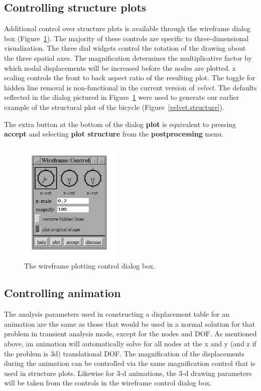 \subsection{Controlling structure plots}

Additional control over structure plots is available through the wireframe
dialog box (Figure~\ref{velvet.wireframe}).  The majority of these controls 
are specific to three-dimensional visualization.  The three dial widgets 
control the rotation of the drawing about the three spatial axes.  The 
magnification determines the multiplicative factor by which nodal 
displacements will be increased before the nodes are plotted.  z scaling 
controls the front to back aspect ratio of the resulting plot.  The toggle
for hidden line removal is non-functional in the current version of
{\em velvet}.  The defaults reflected in the dialog pictured in 
Figure~\ref{velvet.wireframe} were used to generate our earlier example 
of the structural plot of the bicycle (Figure~\ref{velvet.structure}). 

The extra button at the bottom of the dialog {\bf plot} is equivalent to
pressing {\bf accept} and selecting {\bf plot structure} from the 
{\bf postprocessing} menu.

\begin{figure}
\begin{center}
 \includegraphics[width=1.86in]{figures/velvet_wireframe}
\end{center}
\caption{The wireframe plotting control dialog box.}
\label{velvet.wireframe}
\end{figure}

\subsection{Controlling animation}
The analysis parameters used in constructing a displacement table for
an animation are the same as those that would be used in a normal solution
for that problem in transient analysis mode, except for the nodes and DOF.
As mentioned above, an animation will automatically solve for all nodes
at the x and y (and z if the problem is 3d) translational DOF.  The 
magnification of the displacements during the animation can be controlled 
via the same magnification control that is used in structure plots.  Likewise 
for 3-d animations, the 3-d drawing parameters will be taken from the 
controls in the wireframe control dialog box.

